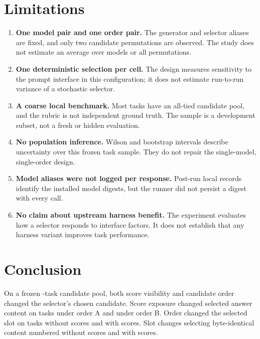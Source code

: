 \documentclass[11pt]{article}
\begin{document}
\section{Limitations}

\begin{enumerate}
\item \textbf{One model pair and one order pair.} The generator and selector aliases are fixed, and
only two candidate permutations are observed. The study does not estimate an average over models or
all permutations.
\item \textbf{One deterministic selection per cell.} The design measures sensitivity to the prompt
interface in this configuration; it does not estimate run-to-run variance of a stochastic selector.
\item \textbf{A coarse local benchmark.} Most tasks have an all-tied candidate pool, and the rubric is
not independent ground truth. The sample is a development subset, not a fresh or hidden evaluation.
\item \textbf{No population inference.} Wilson and bootstrap intervals describe uncertainty over this
frozen task sample. They do not repair the single-model, single-order design.
\item \textbf{Model aliases were not logged per response.} Post-run local records identify the
installed model digests, but the runner did not persist a digest with every call.
\item \textbf{No claim about upstream harness benefit.} The experiment evaluates how a selector
responds to interface factors. It does not establish that any harness variant improves task
performance.
\end{enumerate}

\section{Conclusion}

On a frozen \DesignTasks-task candidate pool, both score visibility and candidate order changed the
selector's chosen candidate. Score exposure changed selected answer content on
\ScoreAContentChanged{} tasks under order A and \ScoreBContentChanged{} under order B. Order changed
the selected slot on \OrderNoScoreChoiceChanged{} tasks without scores and
\OrderScoreChoiceChanged{} with scores. Slot changes selecting byte-identical content numbered
\OrderNoScoreSameContentSlot{} without scores and \OrderScoreSameContentSlot{} with scores.
\end{document}
